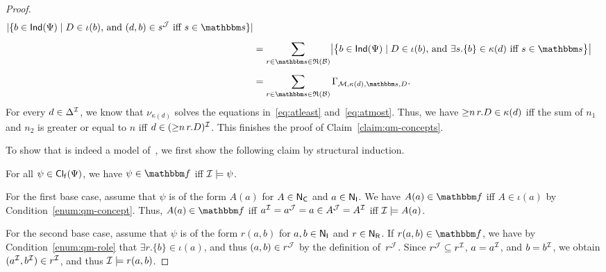 \begin{proof}
\begin{align*}
            \lvert\{b\in\Ind(\Psi)\mid\text{$D\in\iota(b)$, and $(d,b)\in s^\Jmc$ iff $s\in\sbb$}\}\rvert\\[1ex]
        &=\sum_{r\in\sbb\in\Rmf(\Bmc)}
            \bigl\lvert\bigl\{b\in\Ind(\Psi)\mid\text{$D\in\iota(b)$, and $\exists
            s.\{b\}\in\kappa(d)$ iff $s\in\sbb$}\bigr\}\bigr\rvert\\[1ex]
        &=\sum_{r\in\sbb\in\Rmf(\Bmc)}
            \Gamma_{\Mmc,\kappa(d),\sbb,D}.
    \end{align*}
    For every $d\in\Delta^\mathcal{I}$, we know that $\nu_{\kappa(d)}$ solves the
    equations in~\eqref{eq:atleast} and~\eqref{eq:atmost}.  Thus, we have
    ${\ge}n\,r.D\in\kappa(d)$ iff the sum of $n_1$ and $n_2$ is greater or
    equal to $n$ iff $d\in({\ge}n\,r.D)^\mathcal{I}$.
    This finishes the proof of Claim~\ref{claim:qm-concepts}.

    To show that \Imc is indeed a model of~\Bmc, we first show the following
    claim by structural induction.

    \begin{claim}\label{claim:qm-formula-type}
        For all $\psi\in\operatorname{\mathsf{Cl_f}}(\Psi)$, we have $\psi\in\fbb$ iff
        $\mathcal{I}\models\psi$.
    \end{claim}

    \noindent
    For the first base case, assume that $\psi$ is of the form $A(a)$ for
    $A\in\mathsf{N_C}$ and $a\in\mathsf{N_I}$.  We have $A(a)\in\fbb$ iff $A\in\iota(a)$ by
    Condition~\ref{enum:qm-concept}.  Thus, $A(a)\in\fbb$ iff
    $a^\mathcal{I}=a^\mathcal{J}=a\in A^\mathcal{J}=A^\mathcal{I}$ iff $\mathcal{I}\models A(a)$.

    For the second base case, assume that $\psi$ is of the form $r(a,b)$ for
    $a,b\in\mathsf{N_I}$ and $r\in\mathsf{N_R}$.  If $r(a,b)\in\fbb$, we have by
    Condition~\ref{enum:qm-role} that $\exists r.\{b\}\in\iota(a)$, and thus
    $(a,b)\in r^\mathcal{J}$ by the definition of~$r^\mathcal{J}$.  Since $r^\mathcal{J}\subseteq
    r^\mathcal{I}$, $a=a^\mathcal{I}$, and $b=b^\mathcal{I}$, we obtain $(a^\mathcal{I},b^\mathcal{I})\in r^\mathcal{I}$,
    and thus $\mathcal{I}\models r(a,b)$.


\end{proof}
